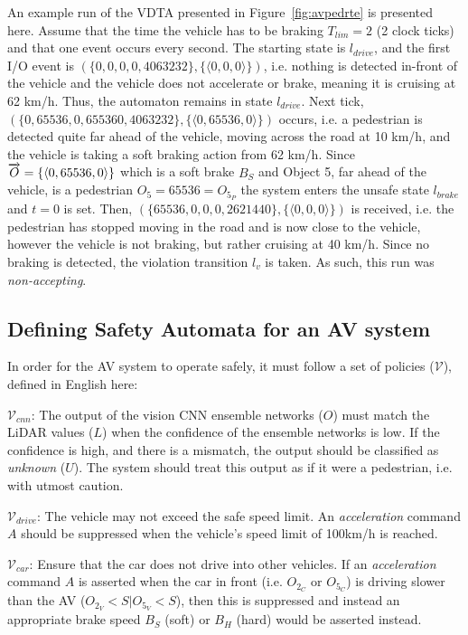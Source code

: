 \begin{example}
	\label{ex:run}
	An example run of the VDTA presented in Figure~\ref{fig:avpedrte} is presented here.
	Assume that the time the vehicle has to be braking $T_{lim} = 2$ (2 clock ticks) and that one event occurs every second. 
	The starting state is $l_{drive}$, and the first I/O event is $(\{0, 0, 0, 0, 4063232\}, \{\langle 0, 0, 0 \rangle\})$, i.e. nothing is detected in-front of the vehicle and the vehicle does not accelerate or brake, meaning it is cruising at 62 km/h.
	Thus, the automaton remains in state $l_{drive}$.
	Next tick, $(\{0, 65536, 0, 655360, 4063232\}, \{\langle 0, 65536, 0 \rangle\})$ occurs, i.e. a pedestrian is detected quite far ahead of the vehicle, moving across the road at 10 km/h, and the vehicle is taking a soft braking action from 62 km/h.
	Since $\overrightarrow{O} = \{\langle 0, 65536, 0 \rangle\}$ which is a soft brake $B_S$ and Object 5, far ahead of the vehicle, is a pedestrian $O_5 = 65536 = O_{5_P}$ the system enters the unsafe state $l_{brake}$ and $t = 0$ is set.
	Then,  $(\{65536, 0, 0, 0, 2621440\}, \{\langle 0, 0, 0 \rangle\})$ is received, i.e. the pedestrian has stopped moving in the road and is now close to the vehicle, however the vehicle is not braking, but rather cruising at 40 km/h.
	Since no braking is detected, the violation transition $l_v$ is taken.
	As such, this run was \textit{non-accepting}.
\end{example}

\subsection{Defining Safety Automata for an \ac{AV} system}
In order for the \ac{AV} system to operate safely, it must follow a set of policies ($\mathcal{V}$), defined in English here:

$\mathcal{V}_{cnn}$: The output of the vision \ac{CNN} ensemble networks ($O$) must match the \ac{LiDAR} values ($L$) when the confidence of the ensemble networks is low. 
If the confidence is high, and there is a mismatch, the output should be classified as \textit{unknown} ($U$).
The system should treat this output as if it were a pedestrian, i.e. with utmost caution.

$\mathcal{V}_{drive}$: The vehicle may not exceed the safe speed limit. 
An \textit{acceleration} command $A$ should be suppressed when the vehicle's speed limit of 100km/h is reached.

$\mathcal{V}_{car}$: Ensure that the car does not drive into other vehicles. If an \textit{acceleration} command $A$ is asserted when the car in front (i.e. $O_{2_C}$ or $O_{5_C}$) is driving slower than the \ac{AV} ($O_{2_V}<S|O_{5_V}<S$), then this is suppressed and instead an appropriate brake speed $B_S$ (soft) or $B_H$ (hard) would be asserted instead.

